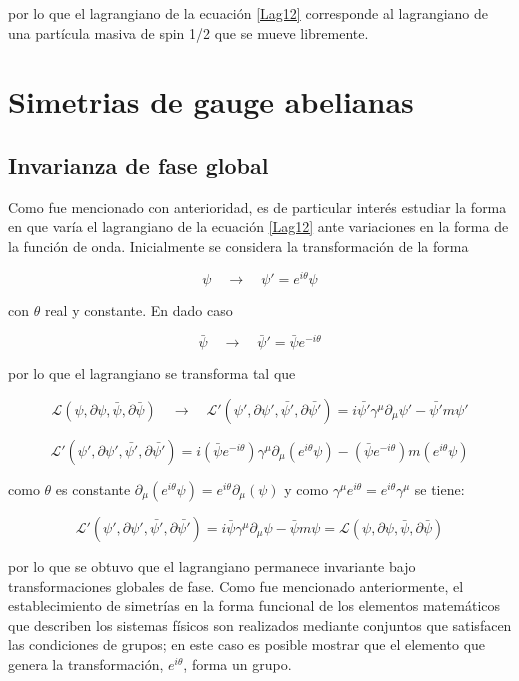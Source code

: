 por lo que el lagrangiano de la ecuación \ref{Lag12} corresponde al lagrangiano de una partícula masiva de spin 1/2 que se mueve libremente.

\section{Simetrias de gauge abelianas}

\subsection{Invarianza de fase global}

Como fue mencionado con anterioridad, es de particular interés estudiar la forma en que varía el lagrangiano de la ecuación \ref{Lag12} ante variaciones en la forma de la función de onda. Inicialmente se considera la transformación de la forma

$$ \psi \quad \longrightarrow \quad \psi ' = e^{i\theta}\psi $$

con $\theta$ real y constante. En dado caso

$$ \bar{\psi} \quad \longrightarrow \quad \bar{\psi} ' = \bar{\psi}e^{-i\theta} $$

por lo que el lagrangiano se transforma tal que

$$ \mathcal{L} ( \psi, \partial \psi, \bar{\psi}, \partial \bar{\psi}) \quad \longrightarrow \quad \mathcal{L}' ( \psi', \partial \psi', \bar{\psi'}, \partial \bar{\psi'}) = i \bar{\psi'}\gamma^{\mu}\partial_{\mu}\psi' - \bar{\psi'}m\psi' $$

\begin{equation}
    \mathcal{L}' ( \psi', \partial \psi', \bar{\psi'}, \partial \bar{\psi'}) = i (\bar{\psi}e^{-i\theta})\gamma^{\mu}\partial_{\mu}(e^{i\theta}\psi) - (\bar{\psi}e^{-i\theta})m(e^{i\theta}\psi)
    \label{u1}
\end{equation}

como $\theta$ es constante $\partial_{\mu}(e^{i\theta}\psi) = e^{i\theta}\partial_{\mu}(\psi)$ y como $\gamma^{\mu}e^{i\theta} = e^{i\theta}\gamma^{\mu}$ se tiene:

\begin{equation}
    \mathcal{L}' ( \psi', \partial \psi', \bar{\psi'}, \partial \bar{\psi'}) = i \bar{\psi}\gamma^{\mu}\partial_{\mu}\psi - \bar{\psi}m\psi = \mathcal{L} ( \psi, \partial \psi, \bar{\psi}, \partial \bar{\psi})
\end{equation}

por lo que se obtuvo que el lagrangiano permanece invariante bajo transformaciones globales de fase. Como fue mencionado anteriormente, el establecimiento de simetrías en la forma funcional de los elementos matemáticos que describen los sistemas físicos son realizados mediante conjuntos que satisfacen las condiciones de grupos; en este caso es posible mostrar que el elemento que genera la transformación, $e^{i\theta}$, forma un grupo.

